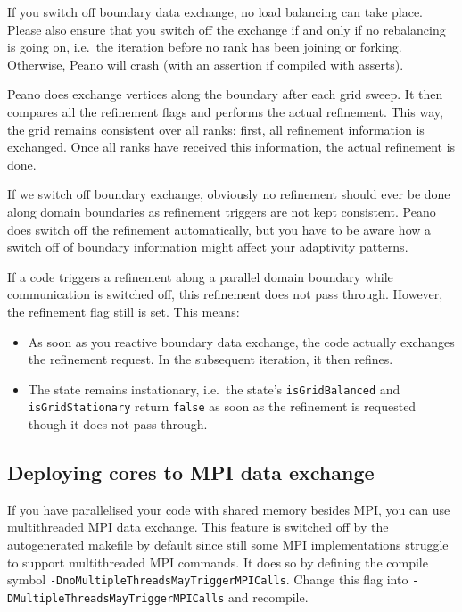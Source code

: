 \begin{remark}
  If you switch off boundary data exchange, no load balancing can take place.
  Please also ensure that you switch off the exchange if and only if no
  rebalancing is going on, i.e.~the iteration before no rank has been joining or
  forking. 
  Otherwise, Peano will crash (with an assertion if compiled with asserts).
\end{remark}


\noindent
Peano does exchange vertices along the boundary after each grid sweep. 
It then compares all the refinement flags and performs the actual refinement.
This way, the grid remains consistent over all ranks: first, all refinement
information is exchanged. 
Once all ranks have received this information, the actual refinement is done.

If we switch off boundary exchange, obviously no refinement should ever be done
along domain boundaries as refinement triggers are not kept consistent.
Peano does switch off the refinement automatically, but you have to be aware how
a switch off of boundary information might affect your adaptivity patterns.

If a code triggers a refinement along a parallel domain boundary while
communication is switched off, this refinement does not pass through.
However, the refinement flag still is set. 
This means:
\begin{itemize}
  \item As soon as you reactive boundary data exchange, the code actually
  exchanges the refinement request. In the subsequent iteration, it then
  refines.
  \item The state remains instationary, i.e.~the state's \texttt{isGridBalanced}
  and \texttt{isGridStationary} return \texttt{false} as soon as the refinement
  is requested though it does not pass through.
\end{itemize}



\subsection{Deploying cores to MPI data exchange}
If you have parallelised your code with shared memory besides MPI, you can use
multithreaded MPI data exchange. 
This feature is switched off by the autogenerated makefile by default since
still some MPI implementations struggle to support multithreaded MPI commands.
It does so by defining the compile symbol
\texttt{-DnoMultipleThreadsMayTriggerMPICalls}.
Change this flag into \texttt{-DMultipleThreadsMayTriggerMPICalls} and
recompile.

